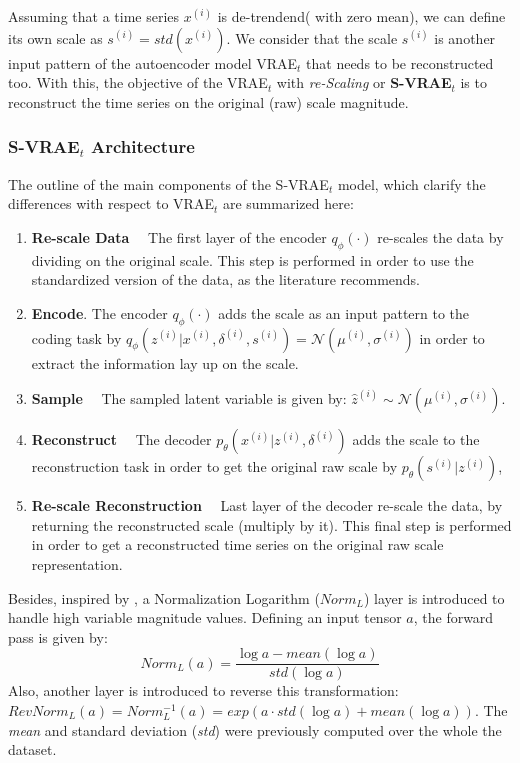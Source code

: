 Assuming that a time series $x^{(i)}$ is de-trendend( with zero mean), we can define its own scale as $s^{(i)} = std(x^{(i)})$. %
We consider that the scale $s^{(i)}$ is another input pattern of the autoencoder model VRAE$_t$ that needs to be reconstructed too. With this, the objective of the VRAE$_t$ with \textit{re-Scaling} or \textbf{S-VRAE$_t$}  is to reconstruct the time series on the original (raw) scale magnitude.

\subsubsection{S-VRAE$_t$ Architecture}
The outline of the main components of the S-VRAE$_t$ model, which clarify the differences with respect to VRAE$_t$ are summarized here:

\begin{enumerate}
    \item \textbf{Re-scale Data} \ \ The first layer of the encoder $q_{\phi}(\cdot)$ re-scales the data by dividing on the original scale. This step is performed in order to use the standardized version of the data, as the literature recommends.
    \item \textbf{Encode}. The encoder $q_{\phi}(\cdot)$ adds the scale as an input pattern to the coding task by $q_{\phi}(z^{(i)}|x^{(i)},\delta^{(i)}, s^{(i)})=\mathcal{N}(\mu^{(i)}, \sigma^{(i)})$ in order to extract the information lay up on the scale. 
    \item \textbf{Sample} \ \ The sampled latent variable is given by:  $\hat{z}^{(i)} \sim \mathcal{N}(\mu^{(i)} , \sigma^{(i)})$.
    \item \textbf{Reconstruct} \ \ The decoder $p_\theta(x^{(i)}|z^{(i)},\delta^{(i)})$ adds the scale to the reconstruction task in order to get the original raw scale by $p_\theta(s^{(i)}|z^{(i)})$, 
    \item \textbf{Re-scale Reconstruction} \ \ Last layer of the decoder re-scale the data, by returning the reconstructed scale (multiply by it). This final step is performed in order to get a reconstructed time series on the original raw scale representation.
\end{enumerate}
Besides, inspired by \citep{ioffe2015batch}, a Normalization Logarithm ($Norm_L$) layer is introduced to handle high variable magnitude values. Defining an input tensor $a$, the forward pass is given by:
\begin{equation}
     Norm_L(a) = \frac{ \log{a} - mean(\log{a}) }{ std(\log{a})}
\end{equation}
Also, another layer is introduced to reverse this transformation: $RevNorm_L(a) = Norm_L^{-1}(a) = exp(a \cdot std(\log{a}) + mean(\log{a}))$. The \textit{mean} and standard deviation (\textit{std}) were previously computed over the whole the dataset.

